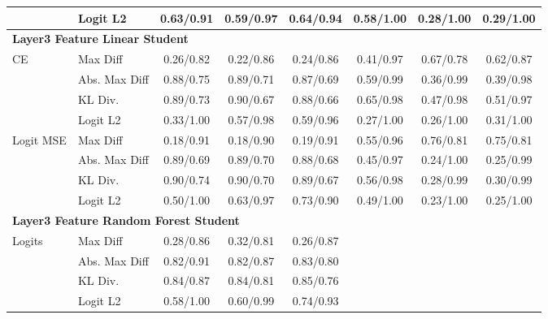 \documentclass[border=2pt]{standalone}
\begin{document}
\begin{tabular}{llcccccc}
 & Logit L2 & 0.63/0.91 & 0.59/0.97 & 0.64/0.94 & 0.58/1.00 & 0.28/1.00 & 0.29/1.00 \\
\midrule
\multicolumn{8}{l}{\textbf{Layer3 Feature Linear Student}} \\
CE & Max Diff & 0.26/0.82 & 0.22/0.86 & 0.24/0.86 & 0.41/0.97 & 0.67/0.78 & 0.62/0.87 \\
 & Abs. Max Diff & 0.88/0.75 & 0.89/0.71 & 0.87/0.69 & 0.59/0.99 & 0.36/0.99 & 0.39/0.98 \\
 & KL Div. & 0.89/0.73 & 0.90/0.67 & 0.88/0.66 & 0.65/0.98 & 0.47/0.98 & 0.51/0.97 \\
 & Logit L2 & 0.33/1.00 & 0.57/0.98 & 0.59/0.96 & 0.27/1.00 & 0.26/1.00 & 0.31/1.00 \\
\addlinespace
Logit MSE & Max Diff & 0.18/0.91 & 0.18/0.90 & 0.19/0.91 & 0.55/0.96 & 0.76/0.81 & 0.75/0.81 \\
 & Abs. Max Diff & 0.89/0.69 & 0.89/0.70 & 0.88/0.68 & 0.45/0.97 & 0.24/1.00 & 0.25/0.99 \\
 & KL Div. & 0.90/0.74 & 0.90/0.70 & 0.89/0.67 & 0.56/0.98 & 0.28/0.99 & 0.30/0.99 \\
 & Logit L2 & 0.50/1.00 & 0.63/0.97 & 0.73/0.90 & 0.49/1.00 & 0.23/1.00 & 0.25/1.00 \\
\midrule
\multicolumn{8}{l}{\textbf{Layer3 Feature Random Forest Student}} \\
Logits & Max Diff & 0.28/0.86 & 0.32/0.81 & 0.26/0.87 &  &  &  \\
 & Abs. Max Diff & 0.82/0.91 & 0.82/0.87 & 0.83/0.80 &  &  &  \\
 & KL Div. & 0.84/0.87 & 0.84/0.81 & 0.85/0.76 &  &  &  \\
 & Logit L2 & 0.58/1.00 & 0.60/0.99 & 0.74/0.93 &  &  &  \\
\bottomrule
\end{tabular}
\end{document}
